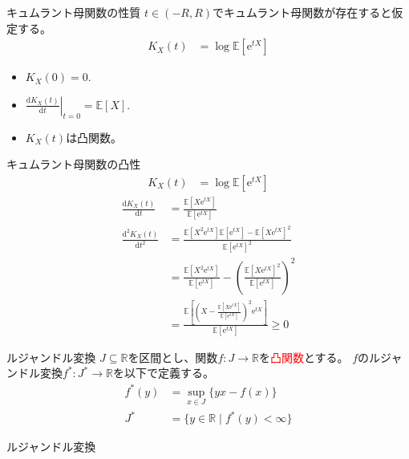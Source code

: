\documentclass[lualatex,handout]{beamer}
\newcommand{\emm}[1]{\textcolor{red}{#1}}
\newcommand{\expt}[1]{\mathbb{E}\left[#1\right]}
\theoremstyle{definition}
\begin{document}
\begin{frame}{キュムラント母関数の性質}
$t\in(-R, R)$でキュムラント母関数が存在すると仮定する。
\begin{align*}
K_X(t) &= \log \expt{\mathrm{e}^{tX}}
\end{align*}
\begin{itemize}
\setlength{\itemsep}{2em}
\item $K_X(0) = 0$.
\item $\left.\frac{\mathrm{d}K_X(t)}{\mathrm{d} t}\right|_{t=0} = \expt{X}$.
\item $K_X(t)$は凸関数。
\end{itemize}
\end{frame}

\begin{frame}{キュムラント母関数の凸性}
\begin{align*}
K_X(t) &= \log \expt{\mathrm{e}^{tX}}
\end{align*}
\begin{align*}
\frac{\mathrm{d} K_X(t)}{\mathrm{d}t} &= \frac{\expt{X\mathrm{e}^{tX}}}{\expt{\mathrm{e}^{tX}}}\\
\frac{\mathrm{d}^2 K_X(t)}{\mathrm{d}t^2} &= \frac{\expt{X^2\mathrm{e}^{tX}}\expt{\mathrm{e}^{tX}}-\expt{X\mathrm{e}^{tX}}^2}{\expt{\mathrm{e}^{tX}}^2}\\
&= \frac{\expt{X^2\mathrm{e}^{tX}}}{\expt{\mathrm{e}^{tX}}}-\left(\frac{\expt{X\mathrm{e}^{tX}}^2}{\expt{\mathrm{e}^{tX}}}\right)^2\\
&= \frac{\expt{\left(X-\frac{\expt{X\mathrm{e}^{tX}}}{\expt{\mathrm{e}^{tX}}}\right)^2\mathrm{e}^{tX}}}{\expt{\mathrm{e}^{tX}}}\ge 0
\end{align*}
\end{frame}

\begin{frame}{ルジャンドル変換}
$J\subseteq\mathbb{R}$を区間とし、関数$f\colon J\to\mathbb{R}$を\emm{凸関数}とする。
$f$のルジャンドル変換$f^*\colon J^*\to\mathbb{R}$を以下で定義する。
\begin{align*}
f^*(y) &= \sup_{x\in J}\{yx - f(x)\}\\
J^*&=\{y\in\mathbb{R}\mid f^*(y)<\infty\}
\end{align*}
\end{frame}

\begin{frame}{ルジャンドル変換}
\centering
{}
\end{frame}
\end{document}
